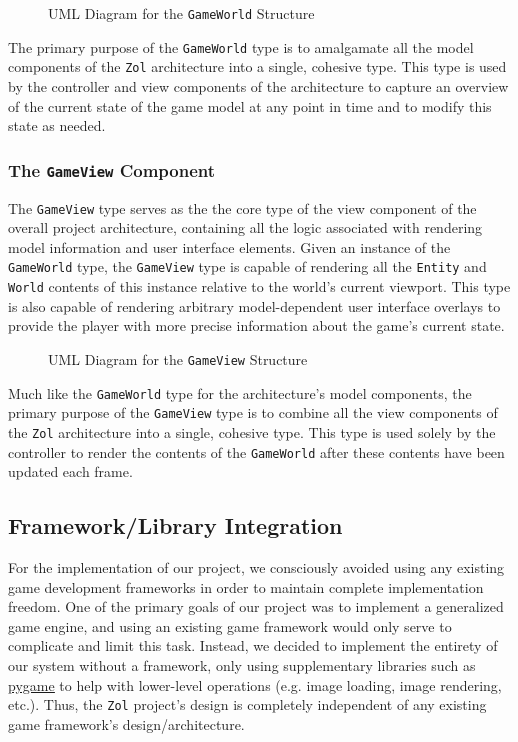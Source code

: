 \documentclass{article}
\newcommand{\classname}[1] {\texttt{#1}}
\newcommand{\projectname}[0] {\texttt{Zol} }
\newcommand{\insertdiagram}[2]
{
	\begin{figure}[H]
		\centering
		\fbox{\texttt{[image: figures/\#1]}}
		\caption{UML Diagram for the \classname{#1} Structure}
	\end{figure}
}
\begin{document}
			\insertdiagram{GameWorld}{3.0in}

			The primary purpose of the \classname{GameWorld} type is to amalgamate
			all the model components of the \projectname architecture into a
			single, cohesive type.  This type is used by the controller and view
			components of the architecture to capture an overview of the current
			state of the game model at any point in time and to modify this state
			as needed.

			\subsubsection[\classname{GameView}]{The \classname{GameView} Component}
			The \classname{GameView} type serves as the the core type of the
			view component of the overall project architecture, containing all
			the logic associated with rendering model information and user
			interface elements.  Given an instance of the \classname{GameWorld}
			type, the \classname{GameView} type is capable of rendering all
			the \classname{Entity} and \classname{World} contents of this
			instance relative to the world's current viewport.  This type
			is also capable of rendering arbitrary model-dependent user
			interface overlays to provide the player with more precise
			information about the game's current state.

			\insertdiagram{GameView}{2.0in}

			Much like the \classname{GameWorld} type for the architecture's
			model components, the primary purpose of the \classname{GameView}
			type is to combine all the view components of the \projectname architecture
			into a single, cohesive type.  This type is used solely by the controller
			to render the contents of the \classname{GameWorld} after these
			contents have been updated each frame.

		\subsection{Framework/Library Integration}
		For the implementation of our project, we consciously avoided using any
		existing game development frameworks in order to maintain complete
		implementation freedom.  One of the primary goals of our project was
		to implement a generalized game engine, and using an existing game
		framework would only serve to complicate and limit this task.  Instead,
		we decided to implement the entirety of our system without a framework,
		only using supplementary libraries such as
        \href{http://www.pygame.org/news.html}{{\color{blue}\underline{pygame}}} to help with lower-level
		operations (e.g. image loading, image rendering, etc.).  Thus, the
		\projectname project's design is completely independent of any existing
		game framework's design/architecture.
\end{document}
